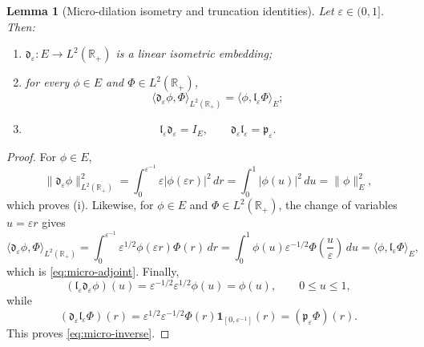 \documentclass[11pt,a4paper]{amsart}
\theoremstyle{plain}
\newtheorem{lemma}[theorem]{Lemma}
\theoremstyle{definition}
\theoremstyle{remark}
\newcommand{\R}{\mathbb{R}}
\newcommand{\one}{\mathbf 1}
\begin{document}
\begin{lemma}[Micro-dilation isometry and truncation identities]
\label{lem:micro-dilation}
Let \(\varepsilon\in(0,1]\). Then:
\begin{enumerate}[label=(\roman*)]
\item \(\mathfrak d_\varepsilon:E\to L^2(\R_+)\) is a linear isometric embedding;
\item for every \(\phi\in E\) and \(\Phi\in L^2(\R_+)\),
\begin{equation}\label{eq:micro-adjoint}
\langle \mathfrak d_\varepsilon\phi,\Phi\rangle_{L^2(\R_+)}
=
\langle \phi,\mathfrak l_\varepsilon\Phi\rangle_E;
\end{equation}
\item
\begin{equation}\label{eq:micro-inverse}
\mathfrak l_\varepsilon\mathfrak d_\varepsilon=I_E,
\qquad
\mathfrak d_\varepsilon\mathfrak l_\varepsilon=\mathfrak p_\varepsilon.
\end{equation}
\end{enumerate}
\end{lemma}

\begin{proof}
For \(\phi\in E\),
\[
\|\mathfrak d_\varepsilon\phi\|_{L^2(\R_+)}^2
=
\int_0^{\varepsilon^{-1}}\varepsilon |\phi(\varepsilon r)|^2\,dr
=
\int_0^1 |\phi(u)|^2\,du
=
\|\phi\|_E^2,
\]
which proves (i). Likewise, for \(\phi\in E\) and \(\Phi\in L^2(\R_+)\), the change of variables
\(u=\varepsilon r\) gives
\[
\langle \mathfrak d_\varepsilon\phi,\Phi\rangle_{L^2(\R_+)}
=
\int_0^{\varepsilon^{-1}} \varepsilon^{1/2}\phi(\varepsilon r)\Phi(r)\,dr
=
\int_0^1 \phi(u)\varepsilon^{-1/2}\Phi\!\left(\frac{u}{\varepsilon}\right)\,du
=
\langle \phi,\mathfrak l_\varepsilon\Phi\rangle_E,
\]
which is \eqref{eq:micro-adjoint}. Finally,
\[
(\mathfrak l_\varepsilon\mathfrak d_\varepsilon\phi)(u)
=
\varepsilon^{-1/2}\varepsilon^{1/2}\phi(u)
=
\phi(u),
\qquad 0\le u\le 1,
\]
while
\[
(\mathfrak d_\varepsilon\mathfrak l_\varepsilon\Phi)(r)
=
\varepsilon^{1/2}\varepsilon^{-1/2}\Phi(r)\one_{[0,\varepsilon^{-1}]}(r)
=
(\mathfrak p_\varepsilon\Phi)(r).
\]
This proves \eqref{eq:micro-inverse}.
\end{proof}
\end{document}
